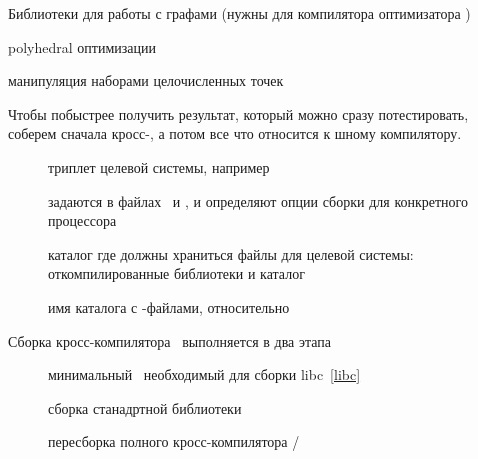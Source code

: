 \bigskip\noindent
Библиотеки для работы с графами (нужны для компилятора оптимизатора
)
\begin{description}[nosep]
\item[cloog0] polyhedral оптимизации
\item[isl0] манипуляция наборами целочисленных точек
\end{description}



Чтобы побыстрее получить результат, который можно сразу потестировать, соберем
сначала кросс-, а потом все что относится к \ci шному
компилятору.

\begin{description}
\item[] триплет целевой системы, например 
\item[] задаются в файлах \ и
, и определяют опции сборки  для
конкретного процессора
\item[] каталог где должны храниться файлы для целевой
системы: откомпилированные библиотеки и каталог 
\item[] имя каталога с
-файлами, относительно 
\end{description}




Сборка кросс-компилятора \ci\ выполняется в два этапа

\begin{description}
  \item[] минимальный \ необходимый для сборки libc\
  \ref{libc}
  \item[] сборка станадртной библиотеки \ci
  \item[] пересборка полного кросс-компилятора \ci/\cpp
\end{description} 

